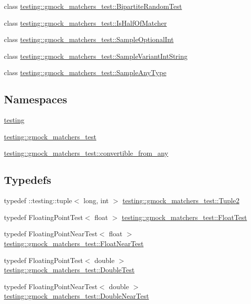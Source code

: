 \begin{DoxyCompactItemize}
class \mbox{\hyperlink{classtesting_1_1gmock__matchers__test_1_1BipartiteRandomTest}{testing\+::gmock\+\_\+matchers\+\_\+test\+::\+Bipartite\+Random\+Test}}
\item 
class \mbox{\hyperlink{classtesting_1_1gmock__matchers__test_1_1IsHalfOfMatcher}{testing\+::gmock\+\_\+matchers\+\_\+test\+::\+Is\+Half\+Of\+Matcher}}
\item 
class \mbox{\hyperlink{classtesting_1_1gmock__matchers__test_1_1SampleOptionalInt}{testing\+::gmock\+\_\+matchers\+\_\+test\+::\+Sample\+Optional\+Int}}
\item 
class \mbox{\hyperlink{classtesting_1_1gmock__matchers__test_1_1SampleVariantIntString}{testing\+::gmock\+\_\+matchers\+\_\+test\+::\+Sample\+Variant\+Int\+String}}
\item 
class \mbox{\hyperlink{classtesting_1_1gmock__matchers__test_1_1SampleAnyType}{testing\+::gmock\+\_\+matchers\+\_\+test\+::\+Sample\+Any\+Type}}
\end{DoxyCompactItemize}
\subsection*{Namespaces}
\begin{DoxyCompactItemize}
\item 
 \mbox{\hyperlink{namespacetesting}{testing}}
\item 
 \mbox{\hyperlink{namespacetesting_1_1gmock__matchers__test}{testing\+::gmock\+\_\+matchers\+\_\+test}}
\item 
 \mbox{\hyperlink{namespacetesting_1_1gmock__matchers__test_1_1convertible__from__any}{testing\+::gmock\+\_\+matchers\+\_\+test\+::convertible\+\_\+from\+\_\+any}}
\end{DoxyCompactItemize}
\subsection*{Typedefs}
\begin{DoxyCompactItemize}
\item 
typedef \+::testing\+::tuple$<$ long, int $>$ \mbox{\hyperlink{namespacetesting_1_1gmock__matchers__test_a8b82c859cd28da9e7f7d4c6091a3165c}{testing\+::gmock\+\_\+matchers\+\_\+test\+::\+Tuple2}}
\item 
typedef Floating\+Point\+Test$<$ float $>$ \mbox{\hyperlink{namespacetesting_1_1gmock__matchers__test_a145329e433869625f9f0e98a0cdfd7b4}{testing\+::gmock\+\_\+matchers\+\_\+test\+::\+Float\+Test}}
\item 
typedef Floating\+Point\+Near\+Test$<$ float $>$ \mbox{\hyperlink{namespacetesting_1_1gmock__matchers__test_a426b51f464dcb48033946e1bf3cc8795}{testing\+::gmock\+\_\+matchers\+\_\+test\+::\+Float\+Near\+Test}}
\item 
typedef Floating\+Point\+Test$<$ double $>$ \mbox{\hyperlink{namespacetesting_1_1gmock__matchers__test_a944cdd366ed240f29ae8e3ebc753ad5c}{testing\+::gmock\+\_\+matchers\+\_\+test\+::\+Double\+Test}}
\item 
typedef Floating\+Point\+Near\+Test$<$ double $>$ \mbox{\hyperlink{namespacetesting_1_1gmock__matchers__test_aea537d0183ccc65b5c49a75d711993c8}{testing\+::gmock\+\_\+matchers\+\_\+test\+::\+Double\+Near\+Test}}
\end{DoxyCompactItemize}
